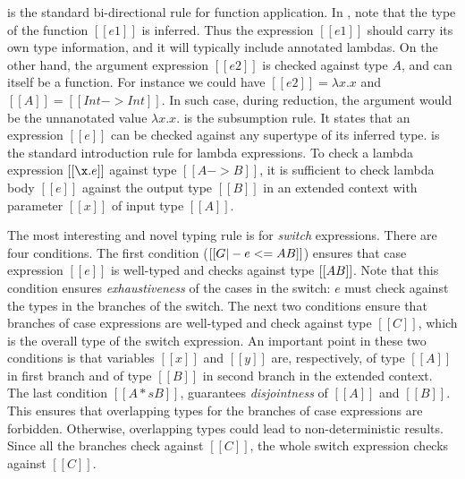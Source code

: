  is the standard bi-directional rule for
function application. In , note that the type of the
function $[[e1]]$ is inferred. Thus the expression $[[e1]]$ should carry
its own type information, and it will typically include annotated lambdas.
On the other hand, the argument expression $[[e2]]$ is checked against type $A$,
and can itself be a function. For instance we could have $[[e2]] = \lambda x. x$
and $[[A]] = [[Int->Int]]$. In such case, during reduction, the argument would be
the unnanotated value $\lambda x. x$.
 is the subsumption rule. It states that an expression
$[[e]]$ can be checked against any supertype of its inferred type.
 is the standard introduction rule for lambda
expressions. To check a lambda expression $[[\x.e]]$ against type $[[A
    -> B]]$, it is sufficient to check lambda body $[[e]]$ against the
output type $[[B]]$ in an extended context with parameter $[[x]]$ of
input type $[[A]]$.

The most interesting and novel typing rule is for
\emph{switch} expressions. There are four conditions.
The first condition ($[[G |-
    e <= A \/ B]]$) ensures that case expression $[[e]]$ is well-typed
and checks against type $[[A \/ B]]$. Note that this condition ensures
\emph{exhaustiveness} of the cases in the switch: $e$ must
check against the types in the branches of the switch. 
The next two conditions ensure that
branches of case expressions are well-typed and check against type
$[[C]]$, which is the overall type of the switch expression.
An important point in these two conditions is that variables
$[[x]]$ and $[[y]]$ are, respectively, of type $[[A]]$ in first branch and of type $[[B]]$ in
second branch in the extended context. 
The last condition
$[[A *s B]]$, guarantees \emph{disjointness} of $[[A]]$ and $[[B]]$.
This ensures that overlapping types for the branches of case expressions
are forbidden. Otherwise, overlapping types could lead to
non-deterministic results.
Since all the branches check against $[[C]]$, the whole
switch expression checks against $[[C]]$.


